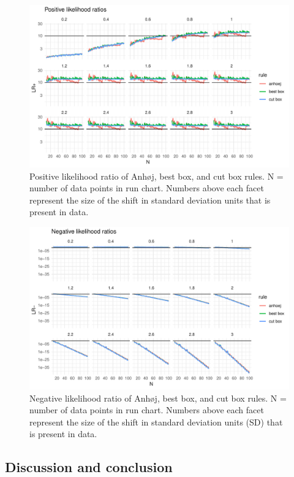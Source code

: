 \begin{figure}[htbp]
  \centering
  \includegraphics[width=\textwidth]{fig_lrpos.pdf}
  \caption{Positive likelihood ratio of Anhøj, best box, and cut box rules.
           N = number of data points in run chart.
           Numbers above each facet represent the size of the shift in standard
           deviation units that is present in data.}
  \label{figure:lrpos}
\end{figure}

\begin{figure}[htbp]
  \centering
  \includegraphics[width=\textwidth]{fig_lrneg.pdf}
  \caption{Negative likelihood ratio of Anhøj, best box, and cut box rules.
           N = number of data points in run chart.
           Numbers above each facet represent the size of the shift in standard
           deviation units (SD) that is present in data.}
  \label{figure:lrneg}
\end{figure}

\hypertarget{discussion-and-conclusion}{%
\subsection{Discussion and conclusion}\label{discussion-and-conclusion}}


